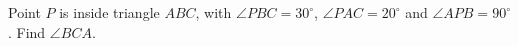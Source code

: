 Point $P$ is inside triangle $ABC$, with $\angle PBC=30^\circ$, $\angle PAC=20^\circ$ and $\angle APB=90^\circ$. Find $\angle BCA$.
